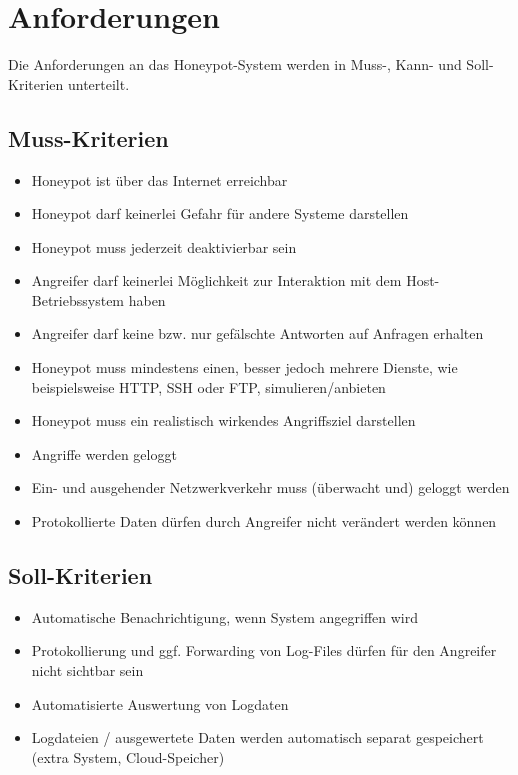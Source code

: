 \chapter{Anforderungen}
\label{ch:Anforderungen}

Die Anforderungen an das Honeypot-System werden in Muss-, Kann- und Soll-Kriterien unterteilt.


\section{Muss-Kriterien}
\label{sec:Muss-Kriterien}
\begin{itemize}
\item Honeypot ist über das Internet erreichbar
\item Honeypot darf keinerlei Gefahr für andere Systeme darstellen
\item Honeypot muss jederzeit deaktivierbar sein
\item Angreifer darf keinerlei Möglichkeit zur Interaktion mit dem Host-Betriebssystem haben
\item Angreifer darf keine bzw. nur gefälschte Antworten auf Anfragen erhalten
\item Honeypot muss mindestens einen, besser jedoch mehrere Dienste, wie beispielsweise HTTP, SSH oder FTP, simulieren/anbieten
\item Honeypot muss ein realistisch wirkendes Angriffsziel darstellen
\item Angriffe werden geloggt
\item Ein- und ausgehender Netzwerkverkehr muss (überwacht und) geloggt werden 
\item Protokollierte Daten dürfen durch Angreifer nicht verändert werden können

\end{itemize}

\newpage

\section{Soll-Kriterien}
\label{sec:Soll-Kriterien}
\begin{itemize}
\item Automatische Benachrichtigung, wenn System angegriffen wird
\item Protokollierung und ggf. Forwarding von Log-Files dürfen für den Angreifer nicht sichtbar sein
\item Automatisierte Auswertung von Logdaten
\item Logdateien / ausgewertete Daten werden automatisch separat gespeichert (extra System, Cloud-Speicher)
\end{itemize}


